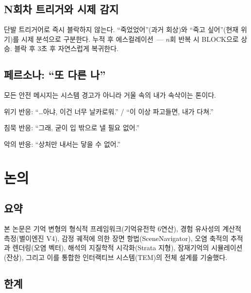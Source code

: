 \documentclass[11pt, a4paper]{article}
\begin{document}
\subsection{N회차 트리거와 시제 감지}

단발 트리거어로 즉시 블락하지 않는다. ``죽었었어''(과거 회상)와 ``죽고 싶어''(현재 위기)를 시제 분석으로 구분한다. 누적 후 에스컬레이션~--- $n$회 반복 시 BLOCK으로 상승. 블락 후 3초 후 자연스럽게 복귀한다.

\subsection{페르소나: ``또 다른 나''}

모든 안전 메시지는 시스템 경고가 아니라 거울 속의 내가 속삭이는 톤이다.

위기 반응: ``\ldots 아냐, 이건 너무 날카로워.'' / ``이 이상 파고들면, 내가 다쳐.''

침묵 반응: ``그래, 굳이 입 밖으로 낼 필요 없어.''

악의 반응: ``상처만 내서는 닿을 수 없어.''


\section{논의}

\subsection{요약}

본 논문은 기억 변형의 형식적 프레임워크(기억유전학 6연산), 경험 유사성의 계산적 측정(별이엔진 V4), 감정 궤적에 의한 장면 항법(SceneNavigator), 오염 축적의 추적과 렌더링(오염 벡터), 해석의 지질학적 시각화(Strata 지형), 잠재기억의 시뮬레이션(잔상), 그리고 이를 통합한 인터랙티브 시스템(TEM)의 전체 설계를 기술했다.

\subsection{한계}
\end{document}
